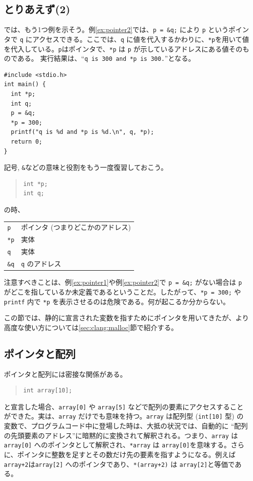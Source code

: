 \subsection{とりあえず(2)}
では、もう1つ例を示そう。例\ref{ex:pointer2}では、\verb|p = &q;| により \verb|p| というポインタで \verb|q| にアクセスできる。ここでは、\verb|q| に値を代入するかわりに、\verb|*p|を用いて値を代入している。\verb|p|はポインタで、\verb|*p| は \verb|p| が示しているアドレスにある値そのものである。
実行結果は、``{\tt q is 300 and *p is 300.}''となる。
\begin{reidai}\label{ex:pointer2}
\begin{verbatim}
#include <stdio.h>
int main() {
  int *p;
  int q;
  p = &q;
  *p = 300;
  printf("q is %d and *p is %d.\n", q, *p);
  return 0;
}
\end{verbatim}
\end{reidai} \noindent
記号{\tt *}, {\tt \&}などの意味と役割をもう一度復習しておこう。
\begin{quote}
\begin{verbatim}
int *p;
int q;
\end{verbatim}
\end{quote}
の時、
\begin{table}[H]
\begin{center}
\begin{tabular}{ll}
  \verb|p|  &ポインタ (つまりどこかのアドレス)\\
  \verb|*p| &実体\\
  \verb|q|  &実体\\
  \verb|&q| &\verb|q| のアドレス
\end{tabular}
\end{center}
\end{table} \noindent
注意すべきことは、例\ref{ex:pointer1}や例\ref{ex:pointer2}で \verb|p = &q;| がない場合は \verb|p| がどこを指しているか未定義であるということだ。したがって、\verb|*p = 300;| や \verb|printf| 内で \verb|*p| を表示させるのは危険である。何が起こるか分からない。

この節では、静的に宣言された変数を指すためにポインタを用いてきたが、より高度な使い方については\ref{sec:clang:malloc}節で紹介する。

\subsection{ポインタと配列}
\label{sec:C:pointer-array}
ポインタと配列には密接な関係がある。
\begin{quote}
\begin{verbatim}
int array[10];
\end{verbatim}
\end{quote}
と宣言した場合、\verb|array[0]| や \verb|array[5]| などで配列の要素にアクセスすることができた。実は、\verb|array| だけでも意味を持つ。\verb|array| は配列型 (\verb|int[10]| 型) の変数で、プログラムコード中に登場した時は、大抵の状況では、自動的に ``配列の先頭要素のアドレス''に暗黙的に変換されて解釈される。つまり、\verb|array| は \verb|array[0]| へのポインタとして解釈され、\verb|*array| は \verb|array[0]|を意味する。さらに、ポインタに整数を足すとその数だけ先の要素を指すようになる。例えば\verb|array+2|は\verb|array[2]| へのポインタであり、\verb|*(array+2)| は \verb|array[2]|と等価である。

